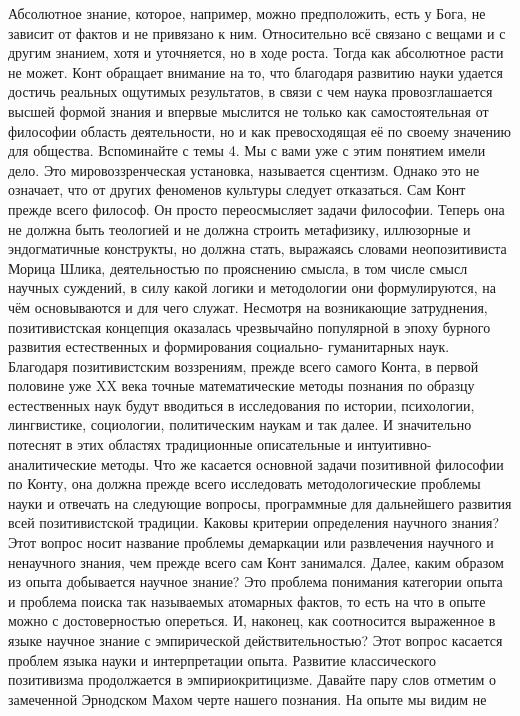 Абсолютное знание, которое, например, можно предположить, есть у Бога, не
зависит от фактов и не привязано к ним. Относительно всё связано с вещами и с
другим знанием, хотя и уточняется, но в ходе роста. Тогда как абсолютное расти
не может. Конт обращает внимание на то, что благодаря развитию науки удается
достичь реальных ощутимых результатов, в связи с чем наука провозглашается
высшей формой знания и впервые мыслится не только как самостоятельная от
философии область деятельности, но и как превосходящая её по своему значению для
общества. Вспоминайте с темы 4. Мы с вами уже с этим понятием имели дело. Это
мировоззренческая установка, называется сцентизм. Однако это не означает, что от
других феноменов культуры следует отказаться. Сам Конт прежде всего философ. Он
просто переосмысляет задачи философии. Теперь она не должна быть теологией и не
должна строить метафизику, иллюзорные и эндогматичные конструкты, но должна
стать, выражаясь словами неопозитивиста Морица Шлика, деятельностью по
прояснению смысла, в том числе смысл научных суждений, в силу какой логики и
методологии они формулируются, на чём основываются и для чего служат. Несмотря
на возникающие затруднения, позитивистская концепция оказалась чрезвычайно
популярной в эпоху бурного развития естественных и формирования социально-
гуманитарных наук. Благодаря позитивистским воззрениям, прежде всего самого
Конта, в первой половине уже XX века точные математические методы познания по
образцу естественных наук будут вводиться в исследования по истории, психологии,
лингвистике, социологии, политическим наукам и так далее. И значительно потеснят
в этих областях традиционные описательные и интуитивно-аналитические методы. Что
же касается основной задачи позитивной философии по Конту, она должна прежде
всего исследовать методологические проблемы науки и отвечать на следующие
вопросы, программные для дальнейшего развития всей позитивистской традиции.
Каковы критерии определения научного знания? Этот вопрос носит название проблемы
демаркации или развлечения научного и ненаучного знания, чем прежде всего сам
Конт занимался. Далее, каким образом из опыта добывается научное знание? Это
проблема понимания категории опыта и проблема поиска так называемых атомарных
фактов, то есть на что в опыте можно с достоверностью опереться. И, наконец, как
соотносится выраженное в языке научное знание с эмпирической действительностью?
Этот вопрос касается проблем языка науки и интерпретации опыта. Развитие
классического позитивизма продолжается в эмпириокритицизме. Давайте пару слов
отметим о замеченной Эрнодском Махом черте нашего познания. На опыте мы видим не
